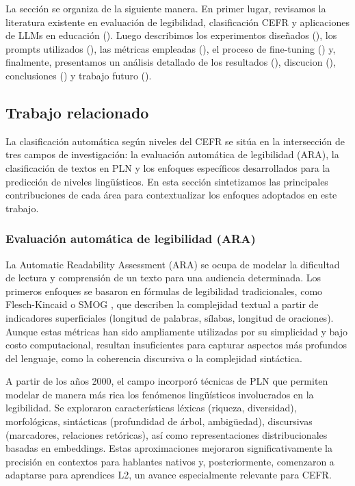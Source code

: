 La sección se organiza de la siguiente manera. En primer lugar, revisamos la literatura existente en evaluación de legibilidad, clasificación CEFR y aplicaciones de LLMs en educación (). Luego describimos los experimentos diseñados (), los prompts utilizados (), las métricas empleadas (), el proceso de fine-tuning () y, finalmente, presentamos un análisis detallado de los resultados (), discucion (), conclusiones () y trabajo futuro ().

\subsection{Trabajo relacionado}\label{subsection:clas_trabajo}
La clasificación automática según niveles del CEFR se sitúa en la intersección de tres campos de investigación: la evaluación automática de legibilidad (ARA), la clasificación de textos en PLN y los enfoques específicos desarrollados para la predicción de niveles lingüísticos. En esta sección sintetizamos las principales contribuciones de cada área para contextualizar los enfoques adoptados en este trabajo.

\subsubsection{Evaluación automática de legibilidad (ARA)}
La Automatic Readability Assessment (ARA) se ocupa de modelar la dificultad de lectura y comprensión de un texto para una audiencia determinada. Los primeros enfoques se basaron en fórmulas de legibilidad tradicionales, como Flesch-Kincaid \cite{Kincaid1975} o SMOG \cite{smog}, que describen la complejidad textual a partir de indicadores superficiales (longitud de palabras, sílabas, longitud de oraciones). Aunque estas métricas han sido ampliamente utilizadas por su simplicidad y bajo costo computacional, resultan insuficientes para capturar aspectos más profundos del lenguaje, como la coherencia discursiva o la complejidad sintáctica.

A partir de los años 2000, el campo incorporó técnicas de PLN que permiten modelar de manera más rica los fenómenos lingüísticos involucrados en la legibilidad. Se exploraron características léxicas (riqueza, diversidad), morfológicas, sintácticas (profundidad de árbol, ambigüedad), discursivas (marcadores, relaciones retóricas), así como representaciones distribucionales basadas en embeddings. Estas aproximaciones mejoraron significativamente la precisión en contextos para hablantes nativos y, posteriormente, comenzaron a adaptarse para aprendices L2, un avance especialmente relevante para CEFR.

